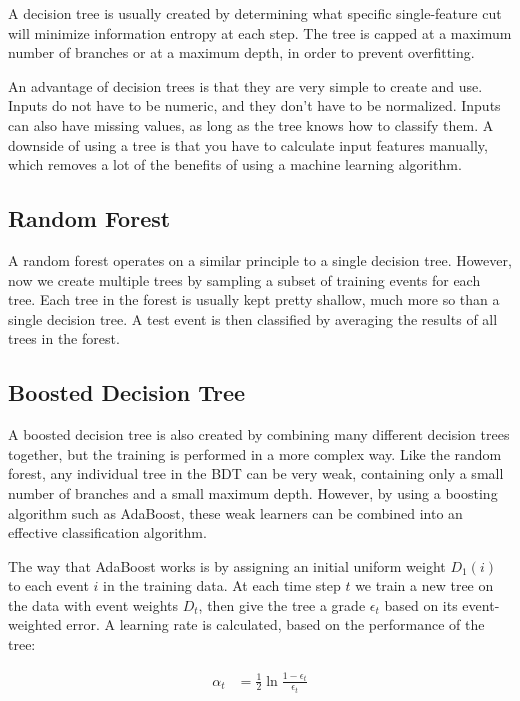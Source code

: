 A decision tree is usually created by determining what specific single-feature cut will minimize information entropy at each step. The tree is capped at a maximum number of branches or at a maximum depth, in order to prevent overfitting.

An advantage of decision trees is that they are very simple to create and use. Inputs do not have to be numeric, and they don't have to be normalized. Inputs can also have missing values, as long as the tree knows how to classify them. A downside of using a tree is that you have to calculate input features manually, which removes a lot of the benefits of using a machine learning algorithm.

\subsection*{Random Forest}

A random forest operates on a similar principle to a single decision tree. However, now we create multiple trees by sampling a subset of training events for each tree. Each tree in the forest is usually kept pretty shallow, much more so than a single decision tree. A test event is then classified by averaging the results of all trees in the forest.

\subsection*{Boosted Decision Tree}

A boosted decision tree is also created by combining many different decision trees together, but the training is performed in a more complex way. Like the random forest, any individual tree in the BDT can be very weak, containing only a small number of branches and a small maximum depth. However, by using a boosting algorithm such as AdaBoost, these weak learners can be combined into an effective classification algorithm.

The way that AdaBoost works is by assigning an initial uniform weight $D_1(i)$ to each event $i$ in the training data. At each time step $t$ we train a new tree on the data with event weights $D_t$, then give the tree a grade $\epsilon_t$ based on its event-weighted error. A learning rate is calculated, based on the performance of the tree:

\begin{align}
    \alpha_t &= \frac{1}{2}\ln{\frac{1-\epsilon_t}{\epsilon_t}}
\end{align}

